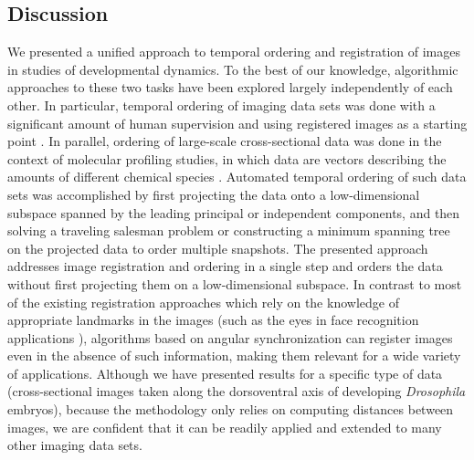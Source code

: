 \documentclass{pnastwo}
\begin{document}
\begin{article}
\section{Discussion}

We presented a unified approach to temporal ordering and registration of images in studies of developmental dynamics. 
%
To the best of our knowledge, algorithmic approaches to these two tasks have been explored largely independently of each other. 
%
In particular, temporal ordering of imaging data sets was done with a significant amount of human supervision and using registered images as a starting point \cite{yuan2014automated, surkova2008characterization}.  
%
In parallel, ordering of large-scale cross-sectional data was done in the context of molecular profiling studies, in which data are vectors describing the amounts of different chemical species \cite{anavy2014blind, trapnell2014dynamics, gupta2008extracting}. 
%
Automated temporal ordering of such data sets was accomplished by first projecting the data onto a low-dimensional subspace spanned by the leading principal or independent components, and then solving a traveling salesman problem or constructing a minimum spanning tree on the projected data to order multiple snapshots. 
%
The presented approach addresses image registration and ordering in a single step and orders the data without first projecting them on a low-dimensional subspace.
%
%
In contrast to most of the existing registration approaches which rely on the knowledge of appropriate landmarks in the images \cite{ian1998statistical} (such as the eyes in face recognition applications \cite{zhao2003face}), algorithms based on angular synchronization can register images even in the absence of such information, making them relevant for a wide variety of applications. 
%
Although we have presented results for a specific type of data (cross-sectional images taken along the dorsoventral axis of developing {\em Drosophila} embryos), because the methodology only relies on computing distances between images, we are confident that it can be readily applied and extended to many other imaging data sets. 


\end{article}
\end{document}
